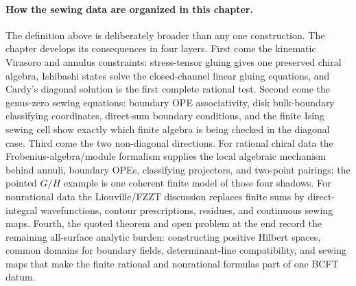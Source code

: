 \paragraph{How the sewing data are organized in this chapter.}
The definition above is deliberately broader than any one construction.  The
chapter develops its consequences in four layers.  First come the kinematic
Virasoro and annulus constraints: stress-tensor gluing gives one preserved
chiral algebra, Ishibashi states solve the closed-channel linear gluing
equations, and Cardy's diagonal solution is the first complete rational test.
Second come the genus-zero sewing equations: boundary OPE associativity,
disk bulk-boundary classifying coordinates, direct-sum boundary conditions,
and the finite Ising sewing cell show exactly which finite algebra is being
checked in the diagonal case.  Third come the two non-diagonal directions.
For rational chiral data the Frobenius-algebra/module formalism supplies the
local algebraic mechanism behind annuli, boundary OPEs, classifying
projectors, and two-point pairings; the pointed \(G/H\) example is one
coherent finite model of those four shadows.  For nonrational data the
Liouville/FZZT discussion replaces finite sums by direct-integral
wavefunctions, contour prescriptions, residues, and continuous sewing maps.
Fourth, the quoted theorem and open problem at the end record the remaining
all-surface analytic burden: constructing positive Hilbert spaces, common
domains for boundary fields, determinant-line compatibility, and sewing maps
that make the finite rational and nonrational formulas part of one BCFT
datum.

